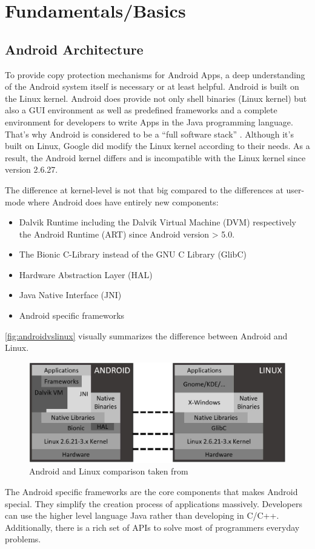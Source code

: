 \chapter{Fundamentals/Basics}\label{chapter:android_basics}

\section{Android Architecture}\label{section:android_architecture}
To provide copy protection mechanisms for Android Apps,
a deep understanding of the Android system itself
is necessary or at least helpful.
Android is built on the Linux kernel. Android does provide not
only shell binaries (Linux kernel) but also a GUI environment
as well as predefined frameworks and a complete environment
for developers to write Apps in the Java programming language.
That's why Android is considered to be a ``full software stack''
\parencite[p.7f]{levin}. Although it's built on Linux,
Google did modify the Linux kernel according to their needs.
As a result, the Android kernel differs and is incompatible
with the Linux kernel since version 2.6.27.

The difference at kernel-level is not that big compared to
the differences at user-mode where Android does have entirely new
components:
\begin{itemize}
\item Dalvik Runtime including the Dalvik Virtual Machine (DVM)
respectively the Android Runtime (ART) since Android version > 5.0.
\item The Bionic C-Library instead of the GNU C Library (GlibC)
\item Hardware Abstraction Layer (HAL)
\item Java Native Interface (JNI)
\item Android specific frameworks
\end{itemize}
\autoref{fig:androidvslinux} visually summarizes the difference
between Android and Linux.
\begin{figure}[htb]
  \includegraphics[width=\textwidth]{figures/androidvslinux}
  \caption[Android vs Linux]{Android and Linux comparison taken from
  ~\parencite[p.9]{levin}}
  \label{fig:androidvslinux}
\end{figure}
The Android specific frameworks are the core components that makes Android
special. They simplify the creation process of applications massively.
Developers can use the higher level language Java rather than developing
in C/C++. Additionally, there is a rich set of APIs to solve most of
programmers everyday problems.

